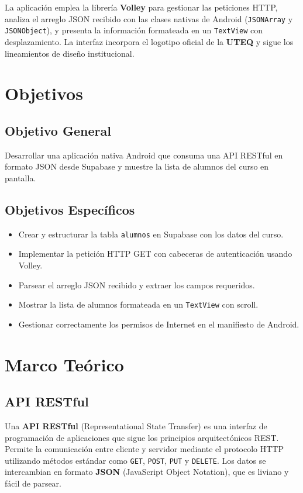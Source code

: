 \documentclass[12pt]{article}
\begin{document}
La aplicación emplea la librería \textbf{Volley} para gestionar las peticiones HTTP, analiza el arreglo JSON recibido con las clases nativas de Android (\texttt{JSONArray} y \texttt{JSONObject}), y presenta la información formateada en un \texttt{TextView} con desplazamiento. La interfaz incorpora el logotipo oficial de la \textbf{UTEQ} y sigue los lineamientos de diseño institucional.

\section{Objetivos}

\subsection{Objetivo General}
Desarrollar una aplicación nativa Android que consuma una API RESTful en formato JSON desde Supabase y muestre la lista de alumnos del curso en pantalla.

\subsection{Objetivos Específicos}
\begin{itemize}[leftmargin=1.5cm]
    \item Crear y estructurar la tabla \texttt{alumnos} en Supabase con los datos del curso.
    \item Implementar la petición HTTP GET con cabeceras de autenticación usando Volley.
    \item Parsear el arreglo JSON recibido y extraer los campos requeridos.
    \item Mostrar la lista de alumnos formateada en un \texttt{TextView} con scroll.
    \item Gestionar correctamente los permisos de Internet en el manifiesto de Android.
\end{itemize}

\section{Marco Teórico}

\subsection{API RESTful}
Una \textbf{API RESTful} (Representational State Transfer) es una interfaz de programación de aplicaciones que sigue los principios arquitectónicos REST. Permite la comunicación entre cliente y servidor mediante el protocolo HTTP utilizando métodos estándar como \texttt{GET}, \texttt{POST}, \texttt{PUT} y \texttt{DELETE}. Los datos se intercambian en formato \textbf{JSON} (JavaScript Object Notation), que es liviano y fácil de parsear.
\end{document}
